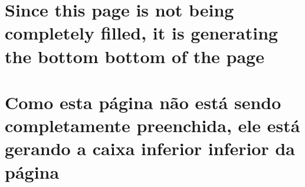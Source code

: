 
\EngAndPor
{\chapter[Page not filled]
  {Since this page is not being completely filled, it is generating the bottom
   bottom of the page}
}
{\chapter[Página não gerada]
  {Como esta página não está sendo completamente preenchida, ele está gerando a
   caixa inferior inferior da página}
}

